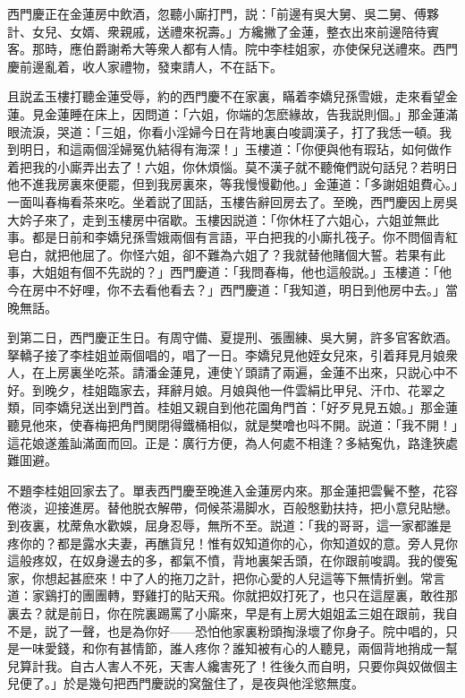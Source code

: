 西門慶正在金蓮房中飲酒，忽聽小廝打門，説：「前邊有吳大舅、吳二舅、傅夥計、女兒、女婿、衆親戚，送禮來祝壽。」方纔撇了金蓮，整衣出來前邊陪待賓客。那時，應伯爵謝希大等衆人都有人情。院中李桂姐家，亦使保兒送禮來。西門慶前邊亂着，收人家禮物，發柬請人，不在話下。

且説孟玉樓打聽金蓮受辱，約的西門慶不在家裏，瞞着李嬌兒孫雪娥，走來看望金蓮。見金蓮睡在床上，因問道：「六姐，你端的怎麽緣故，告我説則個。」那金蓮滿眼流淚，哭道：「三姐，你看小淫婦今日在背地裏白唆調漢子，打了我恁一頓。我到明日，和這兩個淫婦冤仇結得有海深！」玉樓道：「你便與他有瑕玷，如何做作着把我的小廝弄出去了！六姐，你休煩惱。莫不漢子就不聽俺們説句話兒？若明日他不進我房裏來便罷，但到我房裏來，等我慢慢勸他。」金蓮道：「多謝姐姐費心。」一面叫春梅看茶來吃。坐着説了囬話，玉樓告辭回房去了。至晚，西門慶因上房吳大妗子來了，走到玉樓房中宿歇。玉樓因説道：「你休枉了六姐心，六姐並無此事。都是日前和李嬌兒孫雪娥兩個有言語，平白把我的小廝扎筏子。你不問個青紅皂白，就把他屈了。你怪六姐，卻不難為六姐了？我就替他賭個大誓。若果有此事，大姐姐有個不先説的？」西門慶道：「我問春梅，他也這般説。」玉樓道：「他今在房中不好哩，你不去看他看去？」西門慶道：「我知道，明日到他房中去。」當晚無話。

到第二日，西門慶正生日。有周守備、夏提刑、張團練、吳大舅，許多官客飲酒。拏轎子接了李桂姐並兩個唱的，唱了一日。李嬌兒見他姪女兒來，引着拜見月娘衆人，在上房裏坐吃茶。請潘金蓮見，連使丫頭請了兩遍，金蓮不出來，只説心中不好。到晚夕，桂姐臨家去，拜辭月娘。月娘與他一件雲絹比甲兒、汗巾、花翠之類，同李嬌兒送出到門首。桂姐又親自到他花園角門首：「好歹見見五娘。」那金蓮聽見他來，使春梅把角門関閉得鐵桶相似，就是樊噲也呌不開。説道：「我不開！」這花娘遂羞訕滿面而回。正是：廣行方便，為人何處不相逢？多結寃仇，路逢狹處難囬避。

不題李桂姐回家去了。單表西門慶至晚進入金蓮房内來。那金蓮把雲鬢不整，花容倦淡，迎接進房。替他脱衣解帶，伺候茶湯脚水，百般慇勤扶持，把小意兒貼戀。到夜裏，枕蓆魚水歡娛，屈身忍辱，無所不至。説道：「我的哥哥，這一家都誰是疼你的？都是露水夫妻，再醮貨兒！惟有奴知道你的心，你知道奴的意。旁人見你這般疼奴，在奴身邊去的多，都氣不憤，背地裏架舌頭，在你跟前唆調。我的儍寃家，你想起甚麽來！中了人的拖刀之計，把你心愛的人兒這等下無情折剉。常言道：家鷄打的團團轉，野雞打的貼天飛。你就把奴打死了，也只在這屋裏，敢徃那裏去？就是前日，你在院裏踢罵了小廝來，早是有上房大姐姐孟三姐在跟前，我自不是，説了一聲，也是為你好——恐怕他家裏粉頭掏淥壞了你身子。院中唱的，只是一味愛錢，和你有甚情節，誰人疼你？誰知被有心的人聽見，兩個背地捎成一幫兒算計我。自古人害人不死，天害人纔害死了！徃後久而自明，只要你與奴做個主兒便了。」於是幾句把西門慶説的窝盤住了，是夜與他淫慾無度。

